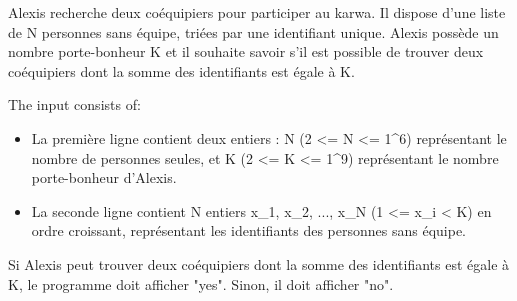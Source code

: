 \problemname{\problemyamlname}


\newcommand{\maxa}{123456789}

Alexis recherche deux coéquipiers pour participer au karwa. Il dispose d'une liste de N personnes sans équipe, triées par une identifiant unique. 
Alexis possède un nombre porte-bonheur K et il souhaite savoir s'il est possible de trouver deux coéquipiers dont la somme des identifiants est égale à K.


\begin{Input}
    The input consists of:
    \begin{itemize}
        \item La première ligne contient deux entiers : N (2 <= N <= 1^6) représentant le nombre de personnes seules, et K (2 <= K <= 1^9) représentant le nombre porte-bonheur d'Alexis.

        \item La seconde ligne contient N entiers x_1, x_2, ..., x_N (1 <= x_i < K) en ordre croissant, représentant les identifiants des personnes sans équipe.
        
    \end{itemize}
\end{Input}

\begin{Output}
    Si Alexis peut trouver deux coéquipiers dont la somme des identifiants est égale à K, le programme doit afficher "yes". Sinon, il doit afficher "no".
\end{Output}
